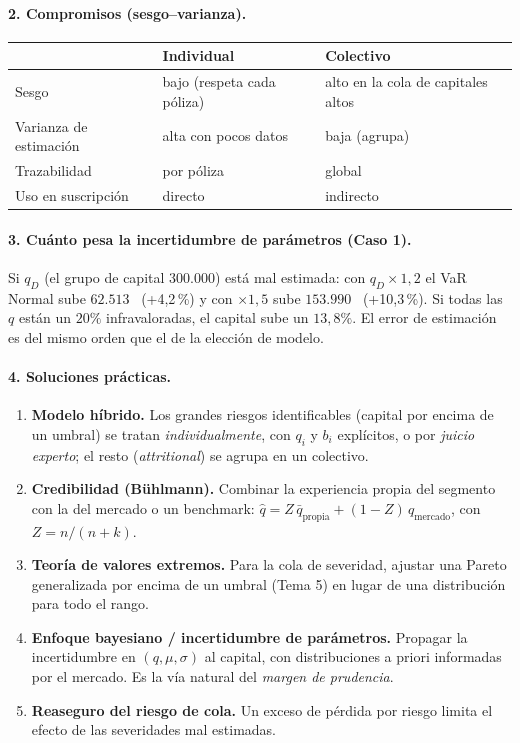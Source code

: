 \documentclass[a4paper,12pt]{article}
\newcommand{\euro}{\texteuro}
\begin{document}
\paragraph{2. Compromisos (sesgo--varianza).}
\begin{center}
\begin{tabular}{p{3.2cm}p{5.6cm}p{5.6cm}}
\toprule
 & Individual & Colectivo\\
\midrule
Sesgo & bajo (respeta cada p\'oliza) & alto en la cola de capitales altos\\
Varianza de estimaci\'on & alta con pocos datos & baja (agrupa)\\
Trazabilidad & por p\'oliza & global\\
Uso en suscripci\'on & directo & indirecto\\
\bottomrule
\end{tabular}
\end{center}

\paragraph{3. Cu\'anto pesa la incertidumbre de par\'ametros (Caso 1).} Si $q_D$ (el grupo de capital $300.000$) est\'a mal estimada: con $q_D\times1{,}2$ el VaR Normal sube $62.513$ \euro\ (+4,2\,\%) y con $\times1{,}5$ sube $153.990$ \euro\ (+10,3\,\%). Si todas las $q$ est\'an un $20\%$ infravaloradas, el capital sube un $13{,}8\%$. El error de estimaci\'on es del mismo orden que el de la elecci\'on de modelo.

\paragraph{4. Soluciones pr\'acticas.}
\begin{enumerate}[leftmargin=*,itemsep=2pt]
\item \textbf{Modelo h\'ibrido.} Los grandes riesgos identificables (capital por encima de un umbral) se tratan \emph{individualmente}, con $q_i$ y $b_i$ expl\'icitos, o por \emph{juicio experto}; el resto (\emph{attritional}) se agrupa en un colectivo.
\item \textbf{Credibilidad (B\"uhlmann).} Combinar la experiencia propia del segmento con la del mercado o un benchmark: $\hat q=Z\,\bar q_{\text{propia}}+(1-Z)\,q_{\text{mercado}}$, con $Z=n/(n+k)$.
\item \textbf{Teor\'ia de valores extremos.} Para la cola de severidad, ajustar una Pareto generalizada por encima de un umbral (Tema 5) en lugar de una distribuci\'on para todo el rango.
\item \textbf{Enfoque bayesiano / incertidumbre de par\'ametros.} Propagar la incertidumbre en $(q,\mu,\sigma)$ al capital, con distribuciones a priori informadas por el mercado. Es la v\'ia natural del \emph{margen de prudencia}.
\item \textbf{Reaseguro del riesgo de cola.} Un exceso de p\'erdida por riesgo limita el efecto de las severidades mal estimadas.
\end{enumerate}
\end{document}
